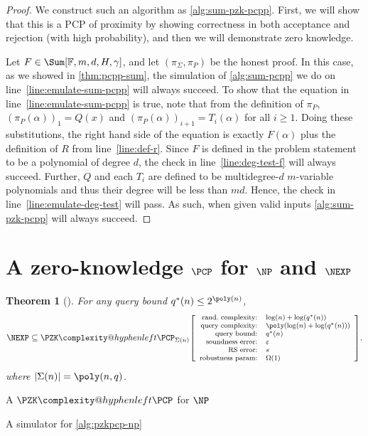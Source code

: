 \documentclass[english,12pt]{reedthesis}
\makeatletter
\theoremstyle{plain}
\newtheorem{thm}{Theorem}[section]
\theoremstyle{definition}
\theoremstyle{remark}
\DeclarePairedDelimiter{\abs}{\lvert}{\rvert}
\newcommand{\pzkpcpr}[6]{%
  \ensuremath%
  \mleft[{\footnotesize\begin{array}{r l}
    \text{rand.\ complexity:} & #1 \\
    \text{query complexity:} & #2 \\
    \text{query bound:} & #3 \\
    \text{soundness error:} & #4 \\
    \text{RS error:} & #5 \\
    \text{robustness param:} & #6
  \end{array}}\mright]%
}
\newcommand{\PZKPCP}{%
  \PZK\complexity@hyphenleft\PCP
}
\makeatother
\begin{document}
\begin{proof}
  We construct such an algorithm as \cref{alg:sum-pzk-pcpp}. First, we will show
  that this is a PCP of proximity by showing correctness in both acceptance and
  rejection (with high probability), and then we will demonstrate zero
  knowledge. %

  Let $F \in \Sum[\mathbb{F}, m, d, H, \gamma]$, and let $(\pi_{\Sigma}, \pi_{P})$ be the honest
  proof. In this case, as we showed in \cref{thm:pcpp-sum}, the simulation of
  \cref{alg:sum-pcpp} we do on line~\ref{line:emulate-sum-pcpp} will always
  succeed. To show that the equation in line~\ref{line:emulate-sum-pcpp} is
  true, note that from the definition of $\pi_{P}$, $(\pi_{P}(\alpha))_{1} = Q(x)$ and
  $(\pi_{P}(\alpha))_{i+1} = T_{i}(\alpha)$ for all $i \ge 1$. Doing these substitutions, the
  right hand side of the equation is exactly $F(\alpha)$ plus the definition of $R$
  from line~\ref{line:def-r}. Since $F$ is defined in the problem statement to
  be a polynomial of degree $d$, the check in line~\ref{line:deg-test-f} will
  always succeed. Further, $Q$ and each $T_{i}$ are defined to be
  multidegree-$d$ $m$-variable polynomials and thus their degree will be less
  than $md$. Hence, the check in line~\ref{line:emulate-deg-test} will pass.
  As such, when given valid inputs \cref{alg:sum-pzk-pcpp} will always succeed.

\end{proof}

\section{A zero-knowledge $\PCP$ for $\NP$ and $\NEXP$}\label{sec:pzkpcp-np-nexp}

\begin{thm}[{\cite[Theorem 6.3]{GOS25}}]\label{thm:np-zk-pcp}
  For any query bound $q^{*}(n) \le 2^{\poly(n)}$,
  \[
    \NEXP \subseteq
    \PZKPCP_{\Sigma(n)}\pzkpcpr{\log(n)+\log(q^{*}(n))}{\poly(\log(n) + \log(q^{*}(n)))}{q^{*}(n)}{\varepsilon}{s}{\Omega(1)}.
  \]
  where $\abs{\Sigma(n)} = \poly(n, q)$.
\end{thm}

\begin{algorithm}[htbp]
  \caption{A $\PZKPCP$ for $\NP$~\cite[Theorem 6.3]{GOS25}}\label{alg:pzkpcp-np}
\end{algorithm}

\begin{algorithm}[htbp]
  \caption{A simulator for \cref{alg:pzkpcp-np}}\label{alg:pzkpcp-np-sim}
\end{algorithm}
\end{document}
